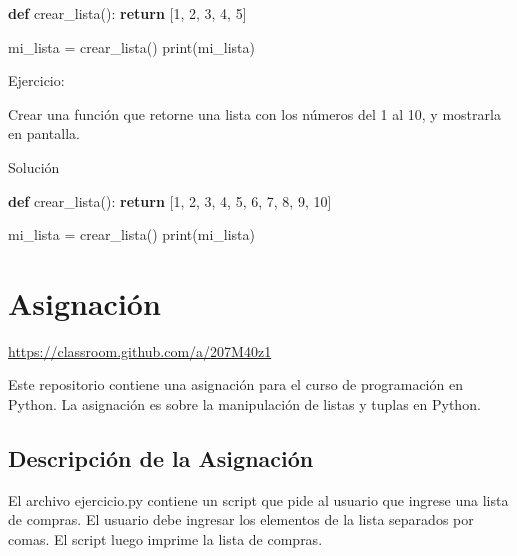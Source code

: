 \documentclass[
  a4paper,
  DIV=11,
  numbers=noendperiod,
  onepage,
  openany]{scrreprt}
\newenvironment{Shaded}{\begin{snugshade}}{\end{snugshade}}
\newcommand{\BuiltInTok}[1]{\textcolor[rgb]{0.00,0.23,0.31}{#1}}
\newcommand{\ControlFlowTok}[1]{\textcolor[rgb]{0.00,0.23,0.31}{\textbf{#1}}}
\newcommand{\DecValTok}[1]{\textcolor[rgb]{0.68,0.00,0.00}{#1}}
\newcommand{\KeywordTok}[1]{\textcolor[rgb]{0.00,0.23,0.31}{\textbf{#1}}}
\newcommand{\NormalTok}[1]{\textcolor[rgb]{0.00,0.23,0.31}{#1}}
\newcommand{\OperatorTok}[1]{\textcolor[rgb]{0.37,0.37,0.37}{#1}}
\begin{document}
\begin{Shaded}
\begin{Highlighting}[]
\KeywordTok{def}\NormalTok{ crear\_lista():}
    \ControlFlowTok{return}\NormalTok{ [}\DecValTok{1}\NormalTok{, }\DecValTok{2}\NormalTok{, }\DecValTok{3}\NormalTok{, }\DecValTok{4}\NormalTok{, }\DecValTok{5}\NormalTok{]}

\NormalTok{mi\_lista }\OperatorTok{=}\NormalTok{ crear\_lista()}
\BuiltInTok{print}\NormalTok{(mi\_lista)}
\end{Highlighting}
\end{Shaded}

Ejercicio:

Crear una función que retorne una lista con los números del 1 al 10, y
mostrarla en pantalla.

Solución

\begin{Shaded}
\begin{Highlighting}[]
  \KeywordTok{def}\NormalTok{ crear\_lista():}
      \ControlFlowTok{return}\NormalTok{ [}\DecValTok{1}\NormalTok{, }\DecValTok{2}\NormalTok{, }\DecValTok{3}\NormalTok{, }\DecValTok{4}\NormalTok{, }\DecValTok{5}\NormalTok{, }\DecValTok{6}\NormalTok{, }\DecValTok{7}\NormalTok{, }\DecValTok{8}\NormalTok{, }\DecValTok{9}\NormalTok{, }\DecValTok{10}\NormalTok{]}

\NormalTok{  mi\_lista }\OperatorTok{=}\NormalTok{ crear\_lista()}
  \BuiltInTok{print}\NormalTok{(mi\_lista)}
\end{Highlighting}
\end{Shaded}

\chapter{Asignación}\label{asignaciuxf3n-2}

\href{https://classroom.github.com/a/nN7ahXDy}{https://classroom.github.com/a/207M40z1}

Este repositorio contiene una asignación para el curso de programación
en Python. La asignación es sobre la manipulación de listas y tuplas en
Python.

\section{Descripción de la
Asignación}\label{descripciuxf3n-de-la-asignaciuxf3n}

El archivo ejercicio.py contiene un script que pide al usuario que
ingrese una lista de compras. El usuario debe ingresar los elementos de
la lista separados por comas. El script luego imprime la lista de
compras.
\end{document}
